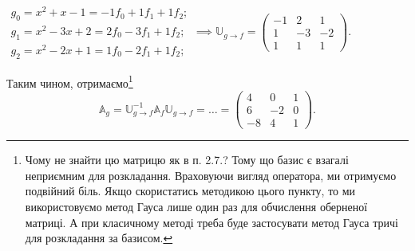 \documentclass{math_library}
\begin{document}
\begin{example}
\begin{center}
$
\begin{gathered}
g_0 = x^2+x-1 = -1f_0+1f_1+1f_2; \\
g_1 = x^2-3x+2 = 2f_0-3f_1+1f_2; \\
g_2 = x^2-2x+1 = 1f_0-2f_1+1f_2;
\end{gathered} \implies \mathbb{U}_{g \to f} = \begin{pmatrix}
-1 & 2 & 1 \\
1 & -3 & -2 \\
1 & 1 & 1
\end{pmatrix}.
$
\end{center}
Таким чином, отримаємо\footnote{Чому не знайти цю матрицю як в п. 2.7.? Тому що базис є взагалі неприємним для розкладання. Враховуючи вигляд оператора, ми отримуємо подвійний біль. Якщо скористатись методикою цього пункту, то ми використовуємо метод Гауса лише один раз для обчислення оберненої матриці. А при класичному методі треба буде застосувати метод Гауса тричі для розкладання за базисом.}
\[
\mathbb{A}_g = \mathbb{U}_{g \to f}^{-1} \mathbb{A}_f \mathbb{U}_{g \to f} = \dots = \begin{pmatrix}
4 & 0 & 1 \\
6 & -2 & 0 \\
-8 & 4 & 1
\end{pmatrix}.
\]
\end{example}
\end{document}
